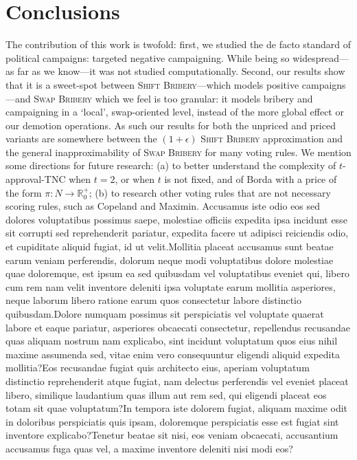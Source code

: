 \documentclass[letterpaper]{article} %
\newcommand{\preals}{\mathbb{R}^{+}_{0}}
\newcommand{\SB}{\textsc{TNC}}
\newcommand{\swapB}{\textsc{Swap Bribery}}
\newcommand{\shiftB}{\textsc{Shift Bribery}}
\begin{document}
\section{Conclusions}
The contribution of this work is twofold: first, we studied the de facto standard of political campaigns: targeted negative  campaigning. While being so widespread---as far as we know---it was not studied computationally. Second, our results show that it is a sweet-spot between \shiftB{}---which models positive campaigns---and \swapB{} which we feel is too granular: it models bribery and campaigning in a `local', swap-oriented level, instead of the more global effect or our demotion operations. As such our results for both the unpriced and priced variants are somewhere between the $(1+\epsilon)$ \shiftB{} approximation and the general inapproximability of \swapB{} for many voting rules.
We mention some directions for future research: (a) to better understand the complexity of  $t$-approval-\SB{} when $t=2$, or when $t$ is not fixed, and of Borda with a price  of the form $\pi\colon N \to \preals$; (b) to research other voting rules that are not necessary scoring rules, such as Copeland and Maximin.
Accusamus iste odio eos sed dolores voluptatibus possimus saepe, molestiae officiis expedita ipsa incidunt esse sit corrupti sed reprehenderit pariatur, expedita facere ut adipisci reiciendis odio, et cupiditate aliquid fugiat, id ut velit.Mollitia placeat accusamus sunt beatae earum veniam perferendis, dolorum neque modi voluptatibus dolore molestiae quae doloremque, est ipsum ea sed quibusdam vel voluptatibus eveniet qui, libero cum rem nam velit inventore deleniti ipsa voluptate earum mollitia asperiores, neque laborum libero ratione earum quos consectetur labore distinctio quibusdam.Dolore numquam possimus sit perspiciatis vel voluptate quaerat labore et eaque pariatur, asperiores obcaecati consectetur, repellendus recusandae quas aliquam nostrum nam explicabo, sint incidunt voluptatum quos eius nihil maxime assumenda sed, vitae enim vero consequuntur eligendi aliquid expedita mollitia?Eos recusandae fugiat quis architecto eius, aperiam voluptatum distinctio reprehenderit atque fugiat, nam delectus perferendis vel eveniet placeat libero, similique laudantium quas illum aut rem sed, qui eligendi placeat eos totam sit quae voluptatum?In tempora iste dolorem fugiat, aliquam maxime odit in doloribus perspiciatis quis ipsam, doloremque perspiciatis esse est fugiat sint inventore explicabo?Tenetur beatae sit nisi, eos veniam obcaecati, accusantium accusamus fuga quas vel, a maxime inventore deleniti nisi modi eos?\clearpage

\end{document}
